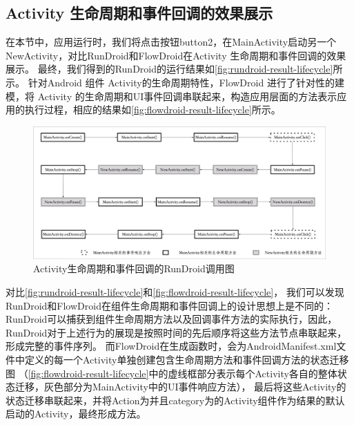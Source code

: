 \subsection{Activity 生命周期和事件回调的效果展示}


在本节中，应用运行时，我们将点击按钮button2，在{MainActivity}启动另一个{NewActivity}，对比RunDroid和FlowDroid在Activity 生命周期和事件回调的效果展示。
最终，我们得到的RunDroid的运行结果如\autoref{fig:rundroid-result-lifecycle}所示。
针对Android 组件 {Activity}的生命周期特性，FlowDroid 进行了针对性的建模，将 Activity 的生命周期和UI事件回调串联起来，构造应用层面的方法表示应用的执行过程，相应的结果如\autoref{fig:flowdroid-result-lifecycle}所示。


\begin{figure}[!ht]
	\centering
	\includegraphics[width=\textwidth]{./Figures/android-lifecycle-rundroid.png}
	\caption{Activity生命周期和事件回调的RunDroid调用图}
	\label{fig:rundroid-result-lifecycle}
\end{figure}


对比\autoref{fig:rundroid-result-lifecycle}和\autoref{fig:flowdroid-result-lifecycle}，
我们可以发现RunDroid和FlowDroid在组件生命周期和事件回调上的设计思想上是不同的：
RunDroid可以捕获到组件生命周期方法以及回调事件方法的实际执行，因此，RunDroid对于上述行为的展现是按照时间的先后顺序将这些方法节点串联起来，形成完整的事件序列。
而FlowDroid在生成函数时，会为AndroidManifest.xml文件中定义的每一个Activity单独创建包含生命周期方法和事件回调方法的状态迁移图
（\autoref{fig:flowdroid-result-lifecycle}中的虚线框部分表示每个Activity各自的整体状态迁移，灰色部分为{MainActivity}中的UI事件响应方法），
最后将这些Activity的状态迁移串联起来，并将Action为并且category为的Activity组件作为结果的默认启动的Activity，最终形成方法。


